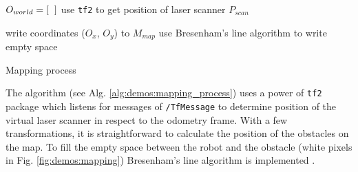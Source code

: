 \vspace*{.4cm}
\begin{algorithm}[H]

$ O_{world} = [\hspace{2mm}] $ 
use \texttt{tf2} to get position of laser scanner $ P_{scan} $\;


write coordinates ($O_{x}$, $O_{y}$) to $ M_{map} $\;
use Bresenham's line algorithm to write empty space\;

\caption{Mapping process}
\label{alg:demos:mapping_process}
\end{algorithm}
\vspace*{.4cm}

The algorithm (see Alg. \ref{alg:demos:mapping_process}) uses a power of \texttt{tf2} package which listens for messages of \texttt{/TfMessage} to determine position of the virtual laser scanner in respect to the odometry frame. With a few transformations, it is straightforward to calculate the position of the obstacles on the map. To fill the empty space between the robot and the obstacle (white pixels in Fig. \ref{fig:demos:mapping}) Bresenham's line algorithm is implemented \cite{borenstein_measurement_1996}.

